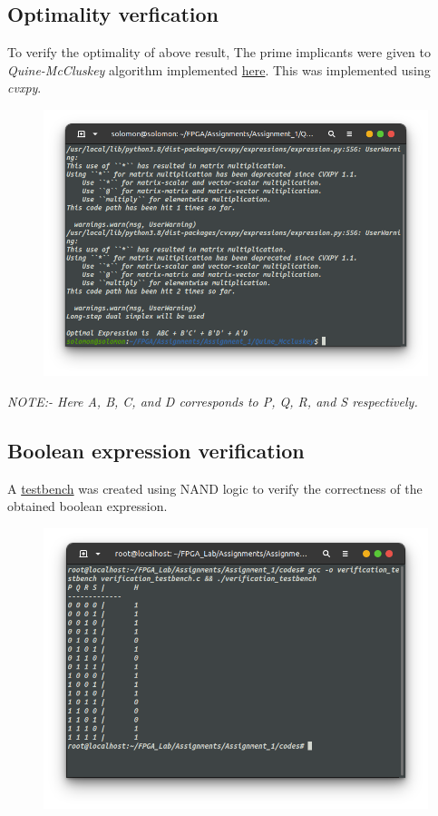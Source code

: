 \documentclass{article}
\begin{document}
\subsection*{Optimality verfication}
To verify the optimality of above result, The prime implicants were given to \textit{Quine-McCluskey} algorithm implemented \href{https://github.com/TUdayKiranReddy/FPGA_Lab/tree/main/Assignments/Assignment_1/Quine_Mccluskey}{here}. This was implemented using \textit{cvxpy}.
\begin{figure}[!h]
\includegraphics[scale=0.45]{./figs/opt.png}
\end{figure}

\textit{NOTE:- Here A, B, C, and D corresponds to P, Q, R, and S respectively.}
    
\subsection*{Boolean expression verification}
A \href{https://github.com/TUdayKiranReddy/FPGA_Lab/tree/main/Assignments/Assignment_1/codes/verification_testbench.c}{testbench} was created using NAND logic to verify the correctness of the obtained boolean expression.
\begin{figure}[h!]
\includegraphics[scale=0.45]{./figs/ver.png}
\end{figure}
\end{document}
